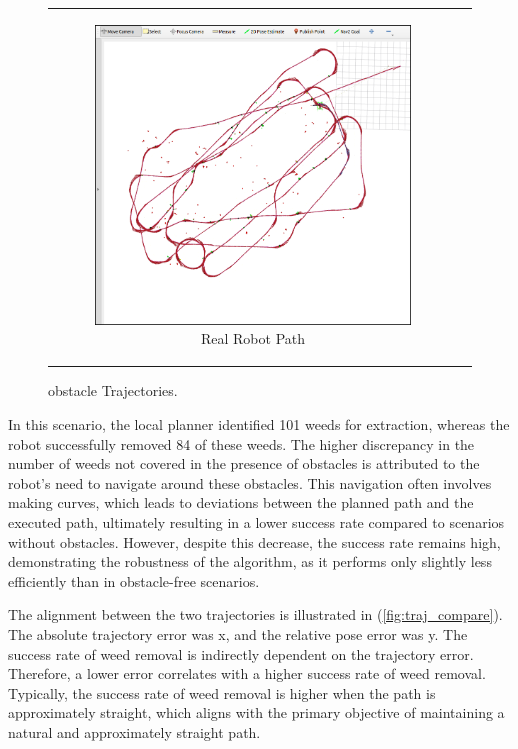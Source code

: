 \begin{figure}[H]
\begin{tabular}{cc}
\begin{subfigure}{0.4\textwidth}
            \includegraphics[width=\textwidth]{Images/real_robot/with_obs_real.png}
            \caption{Real Robot Path}
        \end{subfigure}
    \end{tabular}
    \caption{obstacle Trajectories.\label{fig:obs_traj}} 
\end{figure}

In this scenario, the local planner identified 101 weeds for extraction, whereas the robot successfully removed 84 of these weeds. The higher discrepancy in the number of weeds not covered in the presence of obstacles is attributed to the robot's need to navigate around these obstacles. This navigation often involves making curves, which leads to deviations between the planned path and the executed path, ultimately resulting in a lower success rate compared to scenarios without obstacles. However, despite this decrease, the success rate remains high, demonstrating the robustness of the algorithm, as it performs only slightly less efficiently than in obstacle-free scenarios.

\vspace*{6mm}   


The alignment between the two trajectories is illustrated in (\autoref{fig:traj_compare}). The absolute trajectory error was x, and the relative pose error was y. The success rate of weed removal is indirectly dependent on the trajectory error. Therefore, a lower error correlates with a higher success rate of weed removal. Typically, the success rate of weed removal is higher when the path is approximately straight, which aligns with the primary objective of maintaining a natural and approximately straight path.

